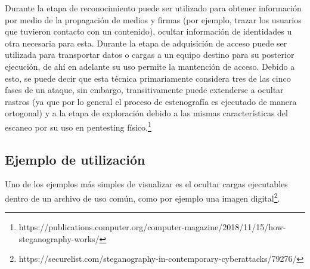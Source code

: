 \documentclass[11pt]{utalcaDoc}
\begin{document}
Durante la etapa de reconocimiento puede ser utilizado para obtener información por medio de la propagación de medios y firmas (por ejemplo, trazar los usuarios que tuvieron contacto con un contenido), ocultar información de identidades u otra necesaria para esta. Durante la etapa de adquisición de acceso puede ser utilizada para transportar datos o cargas a un equipo destino para su posterior ejecución, de ahí en adelante su uso permite la mantención de acceso. Debido a esto, se puede decir que esta técnica primariamente considera tres de las cinco fases de un ataque, sin embargo, transitivamente puede extenderse a ocultar rastros (ya que por lo general el proceso de estenografía es ejecutado de manera ortogonal) y a la etapa de exploración debido a las mismas características del escaneo por su uso en pentesting físico.\footnote{https://publications.computer.org/computer-magazine/2018/11/15/how-steganography-works/}


\subsection{ Ejemplo de utilización }

Uno de los ejemplos más simples de visualizar es el ocultar cargas ejecutables dentro de un archivo de uso común, como por ejemplo una imagen digital\footnote{https://securelist.com/steganography-in-contemporary-cyberattacks/79276/}.



\end{document}
